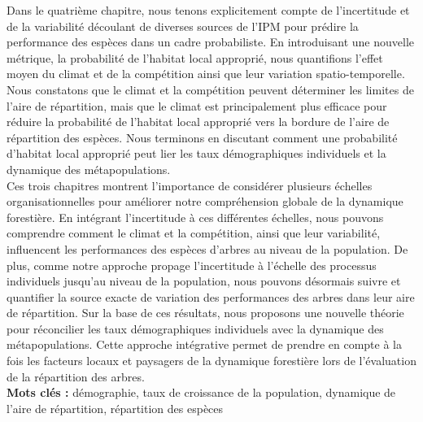 Dans le quatrième chapitre, nous tenons explicitement compte de l'incertitude et de la variabilité découlant de diverses sources de l'IPM pour prédire la performance des espèces dans un cadre probabiliste. En introduisant une nouvelle métrique, la probabilité de l'habitat local approprié, nous quantifions l'effet moyen du climat et de la compétition ainsi que leur variation spatio-temporelle. Nous constatons que le climat et la compétition peuvent déterminer les limites de l'aire de répartition, mais que le climat est principalement plus efficace pour réduire la probabilité de l'habitat local approprié vers la bordure de l'aire de répartition des espèces. Nous terminons en discutant comment une probabilité d'habitat local approprié peut lier les taux démographiques individuels et la dynamique des métapopulations.\\

Ces trois chapitres montrent l'importance de considérer plusieurs échelles organisationnelles pour améliorer notre compréhension globale de la dynamique forestière. En intégrant l'incertitude à ces différentes échelles, nous pouvons comprendre comment le climat et la compétition, ainsi que leur variabilité, influencent les performances des espèces d'arbres au niveau de la population. De plus, comme notre approche propage l'incertitude à l'échelle des processus individuels jusqu'au niveau de la population, nous pouvons désormais suivre et quantifier la source exacte de variation des performances des arbres dans leur aire de répartition. Sur la base de ces résultats, nous proposons une nouvelle théorie pour réconcilier les taux démographiques individuels avec la dynamique des métapopulations. Cette approche intégrative permet de prendre en compte à la fois les facteurs locaux et paysagers de la dynamique forestière lors de l'évaluation de la répartition des arbres.\\

\textbf{Mots clés :} démographie, taux de croissance de la population, dynamique de l'aire de répartition, répartition des espèces

